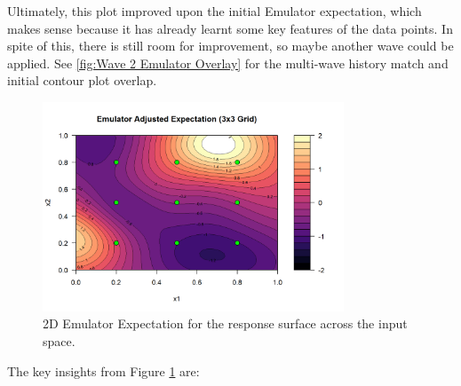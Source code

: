 \noindent Ultimately, this plot improved upon the initial Emulator expectation, which makes sense because it has already learnt some key features of the data points. In spite of this, there is still room for improvement, so maybe another wave could be applied. See \ref{fig:Wave 2 Emulator Overlay} for the multi-wave history match and initial contour plot overlap.

\begin{figure}[H]
    \centering
    \includegraphics[width=0.8\textwidth]{2D Emulator Expectation.png}
    \caption{2D Emulator Expectation for the response surface across the input space.}
    \label{fig:2d_emulator}
\end{figure}

\noindent The key insights from Figure \ref{fig:2d_emulator} are:

